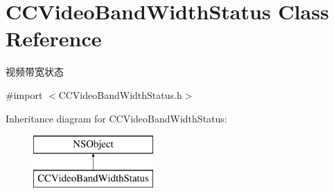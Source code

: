 \hypertarget{interface_c_c_video_band_width_status}{}\section{C\+C\+Video\+Band\+Width\+Status Class Reference}
\label{interface_c_c_video_band_width_status}


视频带宽状态  




{\ttfamily \#import $<$C\+C\+Video\+Band\+Width\+Status.\+h$>$}

Inheritance diagram for C\+C\+Video\+Band\+Width\+Status\+:\begin{figure}[H]
\begin{center}
\leavevmode
\includegraphics[height=2.000000cm]{interface_c_c_video_band_width_status}
\end{center}
\end{figure}
